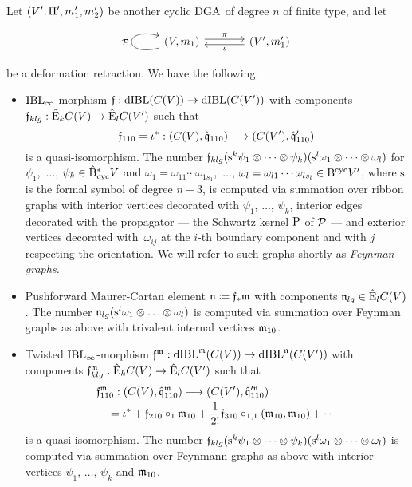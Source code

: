\documentclass[\MainFolder/Text.tex]{subfiles}
\begin{document}
Let $(V',\Pi',m_1',m_2')$ be another cyclic $\mathrm{DGA}$ of degree $n$ of finite type, and let 
\begin{equation}\label{Eq:DefRetr}
\begin{tikzcd}[column sep=large]
(V,m_1)\arrow[loop left]{l}{\Htp}\arrow[shift left]{r}{\pi}&\arrow[shift left]{l}{\iota} (V',m_1')
\end{tikzcd}
\end{equation}
be a deformation retraction. We have the following:
\begin{itemize}
    \item $\mathrm{IBL}_\infty$-morphism $\mathfrak{f}: \mathrm{dIBL}(C(V))\rightarrow \mathrm{dIBL}(C(V'))$ with components $\mathfrak{f}_{klg}: \hat{\mathrm{E}}_k C(V) \rightarrow \hat{\mathrm{E}}_l C(V')$ such that 
 $$ \mathfrak{f}_{110}=\iota^*: (C(V),\hat{\mathfrak{q}}_{110})\longrightarrow(C(V'),\hat{\mathfrak{q}}'_{110}) $$
 is a quasi-isomorphism. The number $\mathfrak{f}_{klg}(\mathrm{s}^k \psi_1\otimes\dotsb\otimes\psi_k)(\mathrm{s}^{l}\omega_1\otimes\dotsb\otimes\omega_l)$
for $\psi_1$,~$\dotsc$, $\psi_k \in \hat{\mathrm{B}}_{\mathrm{cyc}}^* V$ and $\omega_1 = \omega_{11}\dotsb\omega_{1 s_1}$,~$\dotsc$, $\omega_l = \omega_{l1}\dotsb\omega_{ls_l}\in \mathrm{B}^{\mathrm{cyc}} V'$, where $\mathrm{s}$ is the formal symbol of degree $n-3$, is computed via summation over ribbon graphs with interior vertices decorated with $\psi_1$, $\dotsc$, $\psi_k$, interior edges decorated with the propagator --- the Schwartz kernel $\mathrm{P}$ of $\mathcal{P}$ --- and exterior vertices decorated with~$\omega_{ij}$ at the $i$-th boundary component and with $j$ respecting the orientation. We will refer to such graphs shortly as \emph{Feynman graphs.}
    \item Pushforward Maurer-Cartan element $\mathfrak{n} \coloneq\mathfrak{f}_* \mathfrak{m}$ with components $\mathfrak{n}_{lg} \in \hat{\mathrm{E}}_lC(V)$. The number $\mathfrak{n}_{lg}(\mathrm{s}^l\omega_1\otimes \dotsc \otimes \omega_l)$ is computed via summation over Feynman graphs as above with trivalent internal vertices $\mathfrak{m}_{10}$.
    \item Twisted $\mathrm{IBL}_\infty$-morphism $\mathfrak{f}^{\mathfrak{m}}: \mathrm{dIBL}^{\mathfrak{m}}(C(V)) \rightarrow \mathrm{dIBL}^{\mathfrak{n}}(C(V'))$ with components $\mathfrak{f}^{\mathfrak{m}}_{klg}: \hat{\mathrm{E}}_k C(V) \rightarrow \hat{\mathrm{E}}_l C(V')$ such that
 $$\begin{multlined}[t]\HTP_{110}^\MC: (\CycC(V),\hat{\OPQ}_{110}^\MC)\longrightarrow(\CycC(V'),{\hat{\OPQ}'^\PMC}_{110}) \\ =\iota^* + \HTP_{210}\circ_1 \MC_{10} + \frac{1}{2!} \HTP_{310} \circ_{1,1}(\MC_{10}, \MC_{10}) + \dotsb\end{multlined} $$
is a quasi-isomorphism. The number $\mathfrak{f}_{klg}(\mathrm{s}^k \psi_1\otimes\dotsb\otimes\psi_k)(\mathrm{s}^{l}\omega_1\otimes\dotsb\otimes\omega_l)$ is computed via summation over Feynmann graphs as above with interior vertices $\psi_1$, $\dotsc$, $\psi_k$ and $\mathfrak{m}_{10}$.
\end{itemize}
\end{document}
